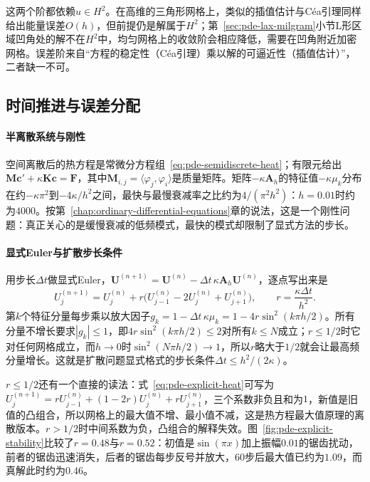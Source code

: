 这两个阶都依赖$u\in H^2$。在高维的三角形网格上，类似的插值估计与Céa引理同样给出能量误差$O(h)$，但前提仍是解属于$H^2$；第~\ref{sec:pde-lax-milgram}小节L形区域凹角处的解不在$H^2$中，均匀网格上的收敛阶会相应降低，需要在凹角附近加密网格。误差阶来自“方程的稳定性（Céa引理）乘以解的可逼近性（插值估计）”，二者缺一不可。

\subsection{时间推进与误差分配}
\label{sec:pde-time-stepping}

\paragraph{半离散系统与刚性}
空间离散后的热方程是常微分方程组~\eqref{eq:pde-semidiscrete-heat}；有限元给出$\bm M\bm c'+\kappa\bm K\bm c=\bm F$，其中$\bm M_{i,j}=\langle\varphi_j,\varphi_i\rangle$是质量矩阵。矩阵$-\kappa\bm A_h$的特征值$-\kappa\mu_k$分布在约$-\kappa\pi^2$到$-4\kappa/h^2$之间，最快与最慢衰减率之比约为$4/(\pi^2h^2)$：$h=0.01$时约为$4000$。按第~\ref{chap:ordinary-differential-equations}章的说法，这是一个刚性问题：真正关心的是缓慢衰减的低频模式，最快的模式却限制了显式方法的步长。

\paragraph{显式Euler与扩散步长条件}
用步长$\Delta t$做显式Euler，$\bm U^{(n+1)}=\bm U^{(n)}-\Delta t\,\kappa\bm A_h\bm U^{(n)}$，逐点写出来是
\begin{equation}
  U_j^{(n+1)}=U_j^{(n)}+r\bigl(U_{j-1}^{(n)}-2U_j^{(n)}+U_{j+1}^{(n)}\bigr),\qquad r=\frac{\kappa\Delta t}{h^2} .
  \label{eq:pde-explicit-heat}
\end{equation}
第$k$个特征分量每步乘以放大因子$g_k=1-\Delta t\,\kappa\mu_k=1-4r\sin^2(k\pi h/2)$。所有分量不增长要求$|g_k|\leq1$，即$4r\sin^2(k\pi h/2)\leq2$对所有$k\leq N$成立；$r\leq1/2$时它对任何网格成立，而$h\to0$时$\sin^2(N\pi h/2)\to1$，所以$r$略大于$1/2$就会让最高频分量增长。这就是扩散问题显式格式的步长条件$\Delta t\leq h^2/(2\kappa)$。

$r\leq1/2$还有一个直接的读法：式~\eqref{eq:pde-explicit-heat}可写为$U_j^{(n+1)}=rU_{j-1}^{(n)}+(1-2r)U_j^{(n)}+rU_{j+1}^{(n)}$，三个系数非负且和为$1$，新值是旧值的凸组合，所以网格上的最大值不增、最小值不减，这是热方程最大值原理的离散版本。$r>1/2$时中间系数为负，凸组合的解释失效。图~\ref{fig:pde-explicit-stability}比较了$r=0.48$与$r=0.52$：初值是$\sin(\pi x)$加上振幅$0.01$的锯齿扰动，前者的锯齿迅速消失，后者的锯齿每步反号并放大，$60$步后最大值已约为$1.09$，而真解此时约为$0.46$。

